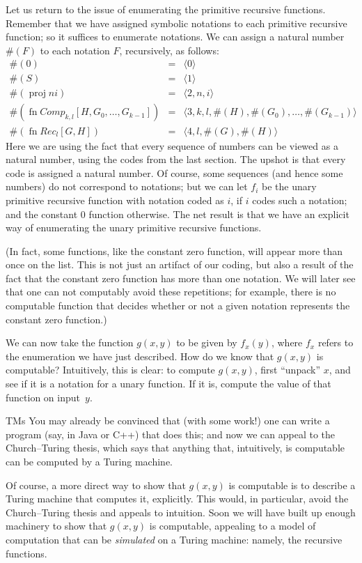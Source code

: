 \documentclass[10pt,a4paper]{article}
\theoremstyle{plain}
\theoremstyle{definition}
\theoremstyle{remark}
\newenvironment{digress}{}{}
\providecommand{\Proj}{\operatorname{proj}}
\providecommand{\fn}{\operatorname{fn}}
\begin{document}
Let us return to the issue of enumerating the primitive recursive
functions. Remember that we have assigned symbolic notations to each
primitive recursive function; so it suffices to enumerate
notations. We can assign a natural number $\#(F)$ to each notation $F$,
recursively, as follows:
\begin{eqnarray*}
\#(0) & = & \langle 0 \rangle \\
\#(S) & = & \langle 1 \rangle \\
\#(\Proj{n}{i}) & = & \langle 2, n, i \rangle \\
\#(\fn{Comp}_{k,l}[H,G_0,\dots,G_{k-1}]) & = & \langle
3,k,l,\#(H),\#(G_0),\dots,\#(G_{k-1}) \rangle \\
\#(\fn{Rec}_l[G,H]) & = & \langle 4, l, \#(G), \#(H) \rangle
\end{eqnarray*}
Here we are using the fact that every sequence of numbers can be viewed
as a natural number, using the codes from the last section. The upshot
is that every code is assigned a natural number. Of course, some
sequences (and hence some numbers) do not correspond to notations; but
we can let $f_i$ be the unary primitive recursive function with
notation coded as $i$, if $i$ codes such a notation; and the constant
$0$ function otherwise. The net result is that we have an explicit way of
enumerating the unary primitive recursive functions.

(In fact, some functions, like the constant zero function, will appear
more than once on the list. This is not just an artifact of our
coding, but also a result of the fact that the constant zero function has
more than one notation. We will later see that one can not computably
avoid these repetitions; for example, there is no computable function
that decides whether or not a given notation represents the constant
zero function.)

We can now take the function $g(x,y)$ to be given by $f_x(y)$, where
$f_x$ refers to the enumeration we have just described. How do we know
that $g(x,y)$ is computable? Intuitively, this is clear: to compute
$g(x,y)$, first ``unpack'' $x$, and see if it is a notation for a unary
function. If it is, compute the value of that function on input~$y$.

\begin{tagblock}{TMs}
\begin{digress}
You may already be convinced that (with some work!) one can write a
program (say, in Java or C++) that does this; and now we can appeal to
the Church--Turing thesis, which says that anything that, intuitively,
is computable can be computed by a Turing machine.

Of course, a more direct way to show that $g(x,y)$ is computable is to
describe a Turing machine that computes it, explicitly. This would,
in particular, avoid the Church--Turing thesis and appeals to
intuition. Soon we will have built up enough machinery to show
that $g(x,y)$ is computable, appealing to a model of computation that
can be \emph{simulated} on a Turing machine: namely, the recursive
functions.
\end{digress}
\end{tagblock}
\end{document}
